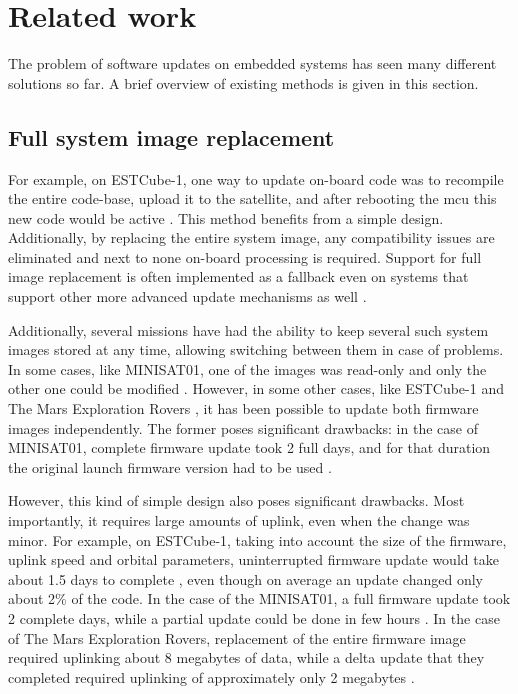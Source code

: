 \newpage
\section{Related work}
\label{s:relatedwork}

The problem
of software updates on embedded systems has seen many different solutions so far. A brief overview of existing methods is given in this section.

\subsection{Full system image replacement}

For example, on ESTCube-1, one way to update on-board code was to recompile the entire code-base, upload it to the satellite, and after rebooting the \gls{mcu} this new code would be active \cite{Suenter2016}. This method benefits from a simple design. Additionally, by replacing the entire system image, any compatibility issues are eliminated and next to none on-board processing is required. Support for full image replacement is often implemented as a fallback even on systems that support other more advanced update mechanisms as well \cite{Tarbe2013,Greco2005,Garrido1998}.

Additionally, several missions have had the ability to keep several such system images stored at any time, allowing switching between them in case of problems. In some cases, like MINISAT01, one of the images was read-only and only the other one could be modified \cite{Garrido1998}. However, in some other cases, like  ESTCube-1 \cite{Tarbe2013} and The Mars Exploration Rovers \cite{Greco2005}, it has been possible to update both firmware images independently. The former poses significant drawbacks: in the case of MINISAT01, complete firmware update took 2 full days, and for that duration the original launch firmware version had to be used \cite{Garrido1998}.

However, this kind of simple design also poses significant drawbacks. Most importantly, it requires large amounts of uplink, even when the change was minor. For example, on ESTCube-1, taking into account the size of the firmware, uplink speed and orbital parameters, uninterrupted firmware update would take about 1.5 days to complete \cite{Suenter2014}, even though on average an update changed only about 2\% of the code. In the case of the MINISAT01, a full firmware update took 2 complete days, while a partial update could be done in few hours \cite{Garrido1998}. In the case of The Mars Exploration Rovers, replacement of the entire firmware image required uplinking about 8 megabytes of data, while a delta update that they completed required uplinking of approximately only 2 megabytes \cite{Greco2005}.

